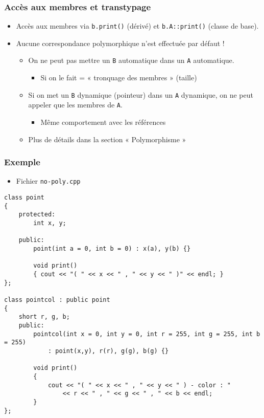 
\begin{frame}
\frametitle{Accès aux membres et transtypage}
\begin{itemize}[<+->]
\item Accès aux membres via \texttt{b.print()} (dérivé) et \texttt{b.A::print()} (classe de base).
\item Aucune correspondance polymorphique n'est effectuée par défaut !
	\begin{itemize}
	\item On ne peut pas mettre un \texttt{B} automatique dans un \texttt{A} automatique.
		\begin{itemize}
		\item Si on le fait = « tronquage des membres » (taille)
		\end{itemize}
	\item Si on met un \texttt{B} dynamique (pointeur) dans un \texttt{A} dynamique, on ne peut appeler que les membres de \texttt{A}.
		\begin{itemize}
		\item Même comportement avec les références
		\end{itemize}
	\item Plus de détails dans la section « Polymorphisme »
	\end{itemize}
\end{itemize}
\end{frame}

\begin{frame}[containsverbatim]
\frametitle{Exemple}
\begin{itemize}[<+->]
\item Fichier \texttt{no-poly.cpp}
\end{itemize}
\begin{lstlisting}
class point
{
	protected:
		int x, y;
	
	public:
		point(int a = 0, int b = 0) : x(a), y(b) {}

		void print()
		{ cout << "( " << x << " , " << y << " )" << endl; }
};

class pointcol : public point
{
	short r, g, b;	
	public:
		pointcol(int x = 0, int y = 0, int r = 255, int g = 255, int b = 255) 
			: point(x,y), r(r), g(g), b(g) {}

		void print()
		{ 
			cout << "( " << x << " , " << y << " ) - color : " 
				<< r << " , " << g << " , " << b << endl; 
		}
};
\end{lstlisting}
\end{frame}

